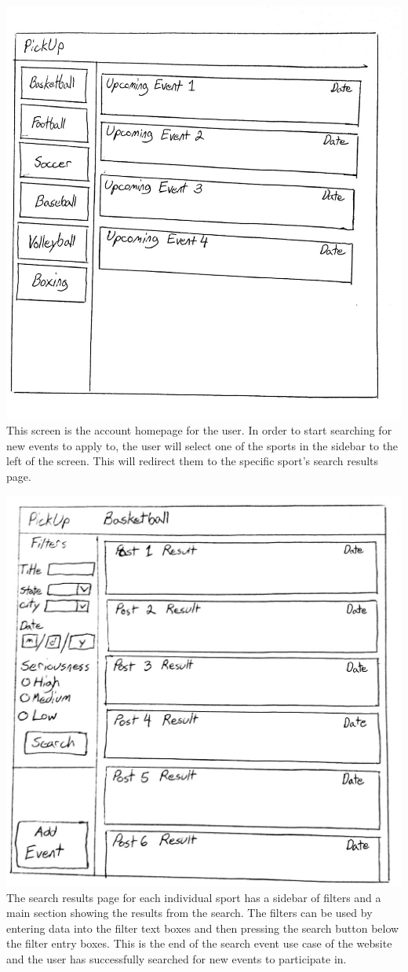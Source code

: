 \documentclass[a4paper]{article}
\begin{document}
\includegraphics[width=\textwidth]{images/homepage-1}
This screen is the account homepage for the user. In order to start searching for new events to apply to, the user will select one of the sports in the sidebar to the left of the screen. This will redirect them to the specific sport's search results page.

\includegraphics[width=\textwidth]{images/search-1}
The search results page for each individual sport has a sidebar of filters and a main section showing the results from the search. The filters can be used by entering data into the filter text boxes and then pressing the search button below the filter entry boxes. This is the end of the search event use case of the website and the user has successfully searched for new events to participate in.
\end{document}
